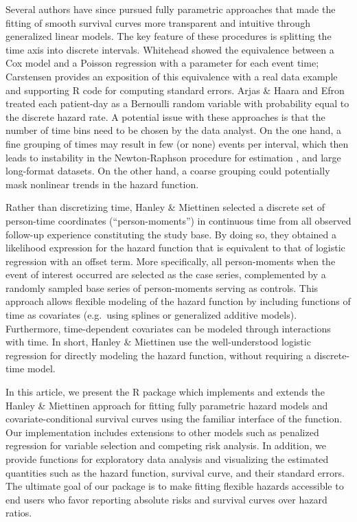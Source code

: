 Several authors have since pursued fully parametric approaches that made
the fitting of smooth survival curves more transparent and intuitive
through generalized linear models. The key feature of these procedures
is splitting the time axis into discrete intervals. Whitehead
\citeyearpar{whitehead1980fitting} showed the equivalence between a Cox
model and a Poisson regression with a parameter for each event time;
Carstensen \citeyearpar{copenhagen2012needs} provides an exposition of
this equivalence with a real data example and supporting R code for
computing standard errors. Arjas \& Haara
\citeyearpar{arjas1987logistic} and Efron
\citeyearpar{efron1988logistic} treated each patient-day as a Bernoulli
random variable with probability equal to the discrete hazard rate. A
potential issue with these approaches is that the number of time bins
need to be chosen by the data analyst. On the one hand, a fine grouping
of times may result in few (or none) events per interval, which then
leads to instability in the Newton-Raphson procedure for estimation
\citep[Section 4.8]{kalbfleisch2011statistical}, and large long-format
datasets. On the other hand, a coarse grouping could potentially mask
nonlinear trends in the hazard function.

Rather than discretizing time, Hanley \& Miettinen
\citeyearpar{hanley2009fitting} selected a discrete set of person-time
coordinates (``person-moments'') in continuous time from all observed
follow-up experience constituting the study base. By doing so, they
obtained a likelihood expression for the hazard function that is
equivalent to that of logistic regression with an offset term. More
specifically, all person-moments when the event of interest occurred are
selected as the case series, complemented by a randomly sampled base
series of person-moments serving as controls. This approach allows
flexible modeling of the hazard function by including functions of time
as covariates (e.g.~using splines or generalized additive models).
Furthermore, time-dependent covariates can be modeled through
interactions with time. In short, Hanley \& Miettinen
\citeyearpar{hanley2009fitting} use the well-understood logistic
regression for directly modeling the hazard function, without requiring
a discrete-time model.

In this article, we present the  R package
\citep{casebase-package} which implements and extends the Hanley \&
Miettinen \citeyearpar{hanley2009fitting} approach for fitting fully
parametric hazard models and covariate-conditional survival curves using
the familiar interface of the  function. Our implementation
includes extensions to other models such as penalized regression for
variable selection and competing risk analysis. In addition, we provide
functions for exploratory data analysis and visualizing the estimated
quantities such as the hazard function, survival curve, and their
standard errors. The ultimate goal of our package is to make fitting
flexible hazards accessible to end users who favor reporting absolute
risks and survival curves over hazard ratios.

